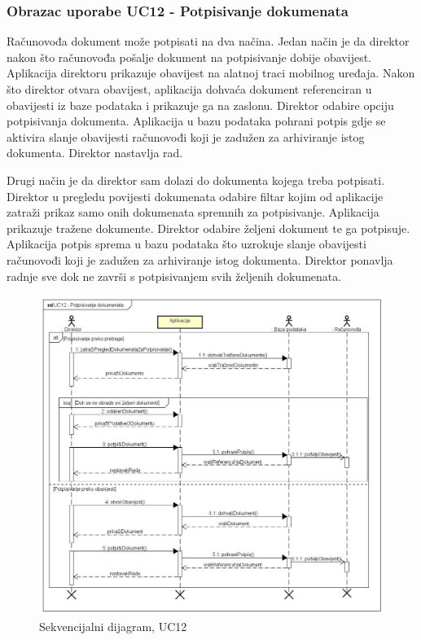 				\subsubsection{Obrazac uporabe UC12 - Potpisivanje dokumenata}
				Računovođa dokument može potpisati na dva načina. Jedan način je da direktor nakon što računovođa pošalje dokument na potpisivanje dobije obavijest. Aplikacija direktoru prikazuje obavijest na alatnoj traci mobilnog uređaja. Nakon što direktor otvara obavijest, aplikacija dohvaća dokument referenciran u obavijesti iz baze podataka i prikazuje ga na zaslonu. Direktor odabire opciju potpisivanja dokumenta. Aplikacija u bazu podataka pohrani potpis gdje se aktivira slanje obavijesti računovođi koji je zadužen za arhiviranje istog dokumenta. Direktor nastavlja rad. \par Drugi način je da direktor sam dolazi do dokumenta kojega treba potpisati. Direktor u pregledu povijesti dokumenata odabire filtar kojim od aplikacije zatraži prikaz samo onih dokumenata spremnih za potpisivanje. Aplikacija prikazuje tražene dokumente. Direktor odabire željeni dokument te ga potpisuje. Aplikacija potpis sprema u bazu podataka što uzrokuje slanje obavijesti računovođi koji je zadužen za arhiviranje istog dokumenta. Direktor ponavlja radnje sve dok ne završi s potpisivanjem svih željenih dokumenata.
				\begin{figure}[H]
					\includegraphics[scale=0.35]{slike/UC12 - Potpisivanje dokumenata} %
					\centering
					\caption{ Sekvencijalni dijagram, UC12}
					\label{fig:promjene}
				\end{figure}
				\eject
	
